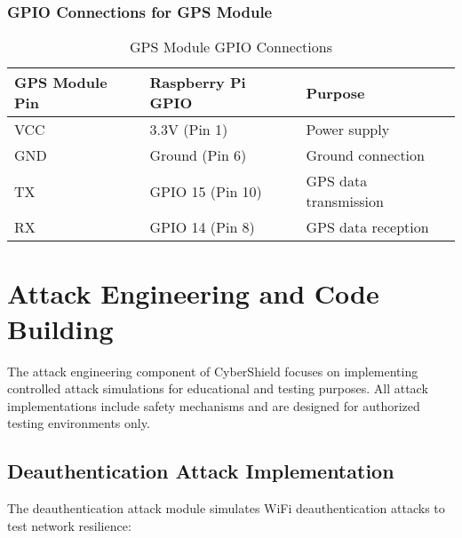 \documentclass[12pt,a4paper]{report}
\begin{document}
\subsubsection{GPIO Connections for GPS Module}

\begin{table}[H]
\centering
\begin{tabular}{|l|l|l|}
\hline
\textbf{GPS Module Pin} & \textbf{Raspberry Pi GPIO} & \textbf{Purpose} \\
\hline
VCC & 3.3V (Pin 1) & Power supply \\
\hline
GND & Ground (Pin 6) & Ground connection \\
\hline
TX & GPIO 15 (Pin 10) & GPS data transmission \\
\hline
RX & GPIO 14 (Pin 8) & GPS data reception \\
\hline
\end{tabular}
\caption{GPS Module GPIO Connections}
\end{table}

\section{Attack Engineering and Code Building}

The attack engineering component of CyberShield focuses on implementing controlled attack simulations for educational and testing purposes. All attack implementations include safety mechanisms and are designed for authorized testing environments only.

\subsection{Deauthentication Attack Implementation}

The deauthentication attack module simulates WiFi deauthentication attacks to test network resilience:
\end{document}
